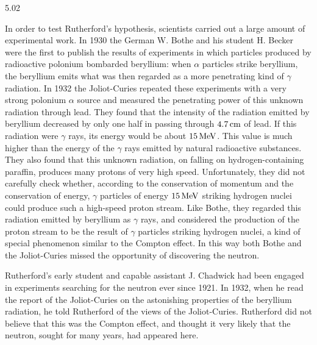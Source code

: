 \begin{solution}{5.02}
\begin{commentary}
In order to test Rutherford's hypothesis, scientists carried out a large amount of
experimental work. In 1930 the German W. Bothe and his student H. Becker were the first to
publish the results of experiments in which particles produced by radioactive polonium
bombarded beryllium: when $\alpha$ particles strike beryllium, the beryllium emits what was
then regarded as a more penetrating kind of $\gamma$ radiation. In 1932 the Joliot-Curies
repeated these experiments with a very strong polonium $\alpha$ source and measured the
penetrating power of this unknown radiation through lead. They found that the intensity of
the radiation emitted by beryllium decreased by only one half in passing through $4.7\,\mathrm{cm}$
of lead. If this radiation were $\gamma$ rays, its energy would be about $15\,\mathrm{MeV}$. This
value is much higher than the energy of the $\gamma$ rays emitted by natural radioactive
substances. They also found that this unknown radiation, on falling on hydrogen-containing
paraffin, produces many protons of very high speed. Unfortunately, they did not carefully
check whether, according to the conservation of momentum and the conservation of energy,
$\gamma$ particles of energy $15\,\mathrm{MeV}$ striking hydrogen nuclei could produce such a
high-speed proton stream. Like Bothe, they regarded this radiation emitted by beryllium as
$\gamma$ rays, and considered the production of the proton stream to be the result of
$\gamma$ particles striking hydrogen nuclei, a kind of special phenomenon similar to the
Compton effect. In this way both Bothe and the Joliot-Curies missed the opportunity of
discovering the neutron.

Rutherford's early student and capable assistant J. Chadwick had been engaged in experiments
searching for the neutron ever since 1921. In 1932, when he read the report of the
Joliot-Curies on the astonishing properties of the beryllium radiation, he told Rutherford of
the views of the Joliot-Curies. Rutherford did not believe that this was the Compton effect,
and thought it very likely that the neutron, sought for many years, had appeared here.


\end{commentary}
\end{solution}
